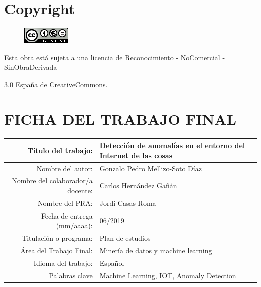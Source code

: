 \setcounter{page}{1} 
\pagestyle{plain}

\chapter*{Copyright}

\vspace{1cm}

\begin{figure}[ht]
    \centering
	\includegraphics[scale=1]{images/license.png}
\end{figure}

Esta obra está sujeta a una licencia de Reconocimiento -  NoComercial - SinObraDerivada

\href{https://creativecommons.org/licenses/by-nc-nd/3.0/es/}{3.0 España de CreativeCommons}.

\chapter*{FICHA DEL TRABAJO FINAL}

\begin{table}[ht]
	\centering{}
	\renewcommand{\arraystretch}{2}
	\begin{tabular}{r | l}
		\hline
		Título del trabajo: & Detección de anomalías en el entorno del Internet de las cosas\\
		\hline
        Nombre del autor: & Gonzalo Pedro Mellizo-Soto Díaz\\
		\hline
        Nombre del colaborador/a docente: & Carlos Hernández Gañán\\
		\hline
        Nombre del PRA: & Jordi Casas Roma\\
		\hline
        Fecha de entrega (mm/aaaa): & 06/2019\\
		\hline
        Titulación o programa: & Plan de estudios\\
		\hline
        Área del Trabajo Final: & Minería de datos y machine learning \\
		\hline
        Idioma del trabajo: & Español\\
		\hline
        Palabras clave & Machine Learning, IOT, Anomaly Detection\\
		\hline
	\end{tabular}
\end{table}

